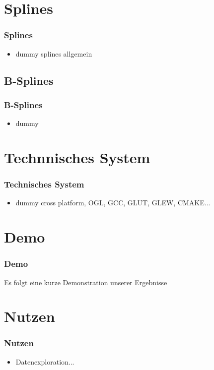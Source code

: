 \documentclass[11pt]{beamer}
\begin{document}
\section{Splines}
\begin{frame}
\frametitle{Splines}
\begin{itemize}
\item dummy splines allgemein
\end{itemize}

\end{frame}



\subsection{B-Splines}
\begin{frame}
\frametitle{B-Splines}

\begin{itemize}
\item dummy
\end{itemize}

\end{frame}



\section{Technnisches System}
\begin{frame}
\frametitle{Technisches System}
\begin{itemize}
\item dummy cross platform, OGL, GCC, GLUT, GLEW, CMAKE...
\end{itemize}

\end{frame}



\section{Demo}
\begin{frame}
\frametitle{Demo}
Es folgt eine kurze Demonstration unserer Ergebnisse

\end{frame}


\section{Nutzen}
\begin{frame}
\frametitle{Nutzen}
\begin{itemize}
\item Datenexploration...
\end{itemize}

\end{frame}
\end{document}
